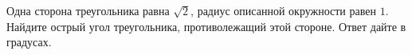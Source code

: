 \begin{ex}
	\begin{condition}
		Одна сторона треугольника равна \( \sqrt{2} \), радиус описанной окружности равен \( 1 \). Найдите острый угол треугольника, противолежащий этой стороне. Ответ дайте в градусах.
	\end{condition}
\end{ex}